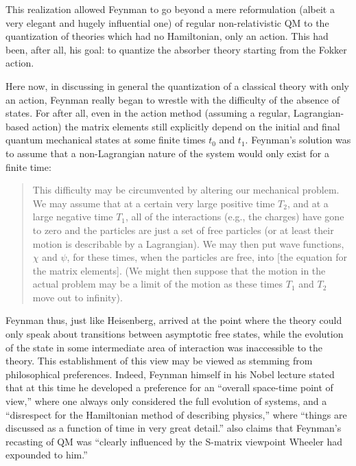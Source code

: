 \documentclass[12pt,a4paper]{article}
\begin{document}
This realization allowed Feynman to go beyond a mere reformulation (albeit a very elegant and hugely influential one) of regular non-relativistic QM to the quantization of theories which had no Hamiltonian, only an action. This had been, after all, his goal: to quantize the absorber theory starting from the Fokker action.

Here now, in discussing in general the quantization of a classical theory with only an action, Feynman really began to wrestle with the difficulty of the absence of states. For after all, even in the action method (assuming a regular, Lagrangian-based action) the matrix elements still explicitly depend on the initial and final quantum mechanical states at some finite times $t_0$ and $t_1$. Feynman's solution was to assume that a non-Lagrangian nature of the system would only exist for a finite time:

\begin{quote}
This difficulty may be circumvented by altering our mechanical problem. We may assume that at a certain very large positive time $T_2$, and at a large negative time $T_1$, all of the interactions (e.g., the charges) have gone to zero and the particles are just a set of free particles (or at least their motion is describable by a Lagrangian). We may then put wave functions, $\chi$ and $\psi$, for these times, when the particles are free, into [the equation for the matrix elements]. (We might then suppose that the motion in the actual problem may be a limit of the motion as these times $T_1$ and $T_2$ move out to infinity).
\end{quote}

Feynman thus, just like Heisenberg, arrived at the point where the theory could only speak about transitions between asymptotic free states, while the evolution of the state in some intermediate area of interaction was inaccessible to the theory. This establishment of this view may be viewed as stemming from philosophical preferences. Indeed, Feynman himself in his Nobel lecture stated that at this time he developed a preference for an ``overall space-time point of view,'' where one always only considered the full evolution of systems, and a ``disrespect for the Hamiltonian method of describing physics,'' where ``things are discussed as a function of time in very great detail.''  \citet[p. 393]{schweber_1994_qed} also claims that Feynman's recasting of QM was ``clearly influenced by the S-matrix viewpoint Wheeler had expounded to him.''
\end{document}
